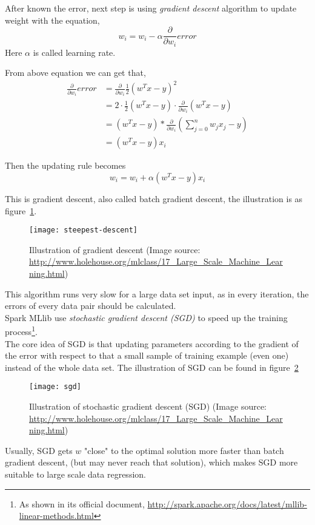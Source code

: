 After known the error, next step is using \emph{gradient descent} algorithm to update weight with the equation,
\begin{equation}
w_i=w_i-\alpha \frac{\partial}{\partial w_i} error
\label{eq:update_equation}
\end{equation}
Here $ \alpha $ is called learning rate.

From above equation we can get that,
\begin{equation}
\begin{split}
\frac{\partial }{\partial w_i} error & = \frac{\partial }{\partial w_i} \frac{1}{2}(w^Tx-y)^2\\
& = 2 \cdot \frac{1}{2} (w^Tx-y) \cdot \frac{\partial }{\partial w_i} (w^Tx-y)\\
& = (w^Tx-y) * \frac{\partial }{\partial w_i} (\sum_{j=0}^{n}w_j x_j - y)\\
& = (w^Tx-y)x_i
\end{split}
\label{eq:partil_error}
\end{equation}

Then the updating rule becomes
\begin{equation}
w_i = w_i + \alpha (w^Tx-y)x_i
\end{equation}

This is gradient descent, also called batch gradient descent, the illustration is as figure~\ref{fg:gradient_descent}.

\begin{figure}[ht]
	\centering
	\texttt{[image: steepest-descent]}
	\caption{Illustration of gradient descent (Image source: \url{http://www.holehouse.org/mlclass/17_Large_Scale_Machine\_Learning.html})}
	\label{fg:gradient_descent}
\end{figure}

This algorithm runs very slow for a large data set input, as in every iteration, the errors of every data pair should be calculated\cite{2_ruder_2016}.\\

Spark MLlib use \emph{stochastic gradient descent (SGD)} to speed up the training process\footnote{As shown in its official document, \url{ http://spark.apache.org/docs/latest/mllib-linear-methods.html}}.\\

The core idea of SGD is that updating parameters according to the gradient of the error with respect to that a small sample of training example (even one) instead of the whole data set\cite{2_ruder_2016}. The illustration of SGD can be found in figure~\ref{fg:SGD}
\begin{figure}[h]
	\centering
	\texttt{[image: sgd]}
	\caption{Illustration of stochastic gradient descent (SGD) (Image source: \url{http://www.holehouse.org/mlclass/17_Large_Scale_Machine_Learning.html})}
	\label{fg:SGD}
\end{figure}
Usually, SGD gets $ w $ "close" to the optimal solution more faster than batch gradient descent, (but may never reach that solution), which makes SGD more suitable to large scale data regression.\\

